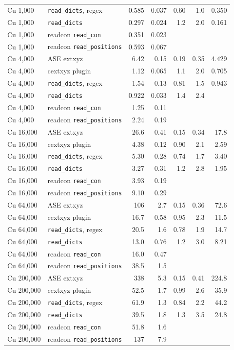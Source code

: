 \begin{tabular}{@{}llrrrrr@{}}
Cu 1{,}000 & \texttt{read\_dicts}, regex & 0.585 & 0.037 & 0.60 & 1.0 & 0.350\\
Cu 1{,}000 & \texttt{read\_dicts} & 0.297 & 0.024 & 1.2 & 2.0 & 0.161\\
Cu 1{,}000 & readcon \texttt{read\_con} & 0.351 & 0.023 &  &  & \\
Cu 1{,}000 & readcon \texttt{read\_positions} & 0.593 & 0.067 &  &  & \\
Cu 4{,}000 & ASE extxyz & 6.42 & 0.15 & 0.19 & 0.35 & 4.429\\
Cu 4{,}000 & cextxyz plugin & 1.12 & 0.065 & 1.1 & 2.0 & 0.705\\
Cu 4{,}000 & \texttt{read\_dicts}, regex & 1.54 & 0.13 & 0.81 & 1.5 & 0.943\\
Cu 4{,}000 & \texttt{read\_dicts} & 0.922 & 0.033 & 1.4 & 2.4 & \\
Cu 4{,}000 & readcon \texttt{read\_con} & 1.25 & 0.11 &  &  & \\
Cu 4{,}000 & readcon \texttt{read\_positions} & 2.24 & 0.19 &  &  & \\
Cu 16{,}000 & ASE extxyz & 26.6 & 0.41 & 0.15 & 0.34 & 17.8\\
Cu 16{,}000 & cextxyz plugin & 4.38 & 0.12 & 0.90 & 2.1 & 2.59\\
Cu 16{,}000 & \texttt{read\_dicts}, regex & 5.30 & 0.28 & 0.74 & 1.7 & 3.40\\
Cu 16{,}000 & \texttt{read\_dicts} & 3.27 & 0.31 & 1.2 & 2.8 & 1.95\\
Cu 16{,}000 & readcon \texttt{read\_con} & 3.93 & 0.19 &  &  & \\
Cu 16{,}000 & readcon \texttt{read\_positions} & 9.10 & 0.29 &  &  & \\
Cu 64{,}000 & ASE extxyz & 106 & 2.7 & 0.15 & 0.36 & 72.6\\
Cu 64{,}000 & cextxyz plugin & 16.7 & 0.58 & 0.95 & 2.3 & 11.5\\
Cu 64{,}000 & \texttt{read\_dicts}, regex & 20.5 & 1.6 & 0.78 & 1.9 & 14.7\\
Cu 64{,}000 & \texttt{read\_dicts} & 13.0 & 0.76 & 1.2 & 3.0 & 8.21\\
Cu 64{,}000 & readcon \texttt{read\_con} & 16.0 & 0.47 &  &  & \\
Cu 64{,}000 & readcon \texttt{read\_positions} & 38.5 & 1.5 &  &  & \\
Cu 200{,}000 & ASE extxyz & 338 & 5.3 & 0.15 & 0.41 & 224.8\\
Cu 200{,}000 & cextxyz plugin & 52.5 & 1.7 & 0.99 & 2.6 & 35.9\\
Cu 200{,}000 & \texttt{read\_dicts}, regex & 61.9 & 1.3 & 0.84 & 2.2 & 44.2\\
Cu 200{,}000 & \texttt{read\_dicts} & 39.5 & 1.8 & 1.3 & 3.5 & 24.8\\
Cu 200{,}000 & readcon \texttt{read\_con} & 51.8 & 1.6 &  &  & \\
Cu 200{,}000 & readcon \texttt{read\_positions} & 137 & 7.9 &  &  & \\
\bottomrule
\end{tabular}
